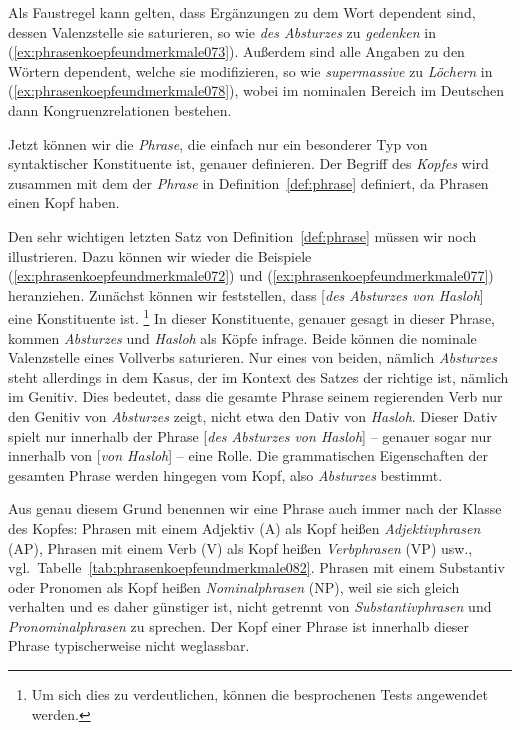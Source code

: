 Als Faustregel kann gelten, dass Ergänzungen zu dem Wort dependent sind, dessen Valenzstelle sie saturieren, so wie \textit{des Absturzes} zu \textit{gedenken} in (\ref{ex:phrasenkoepfeundmerkmale073}).
Außerdem sind alle Angaben zu den Wörtern dependent, welche sie modifizieren, so wie \textit{supermassive} zu \textit{Löchern} in (\ref{ex:phrasenkoepfeundmerkmale078}), wobei im nominalen Bereich im Deutschen dann Kongruenzrelationen bestehen.

Jetzt können wir die \textit{Phrase}, die einfach nur ein besonderer Typ von syntaktischer Konstituente ist, genauer definieren.
Der Begriff des \textit{Kopfes} wird zusammen mit dem der \textit{Phrase} in Definition~\ref{def:phrase} definiert, da Phrasen einen Kopf haben.


Den sehr wichtigen letzten Satz von Definition~\ref{def:phrase} müssen wir noch illustrieren.
Dazu können wir wieder die Beispiele (\ref{ex:phrasenkoepfeundmerkmale072}) und (\ref{ex:phrasenkoepfeundmerkmale077}) heranziehen.
Zunächst können wir feststellen, dass [\textit{des Absturzes von Hasloh}] eine Konstituente ist.%
\footnote{Um sich dies zu verdeutlichen, können die besprochenen Tests angewendet werden.}
In dieser Konstituente, genauer gesagt in dieser Phrase, kommen \textit{Absturzes} und \textit{Hasloh} als Köpfe infrage.
Beide können die nominale Valenzstelle eines Vollverbs saturieren.
Nur eines von beiden, nämlich \textit{Absturzes} steht allerdings in dem Kasus, der im Kontext des Satzes der richtige ist, nämlich im Genitiv.
Dies bedeutet, dass die gesamte Phrase seinem regierenden Verb nur den Genitiv von \textit{Absturzes} zeigt, nicht etwa den Dativ von \textit{Hasloh}.
Dieser Dativ spielt nur innerhalb der Phrase [\textit{des Absturzes von Hasloh}] -- genauer sogar nur innerhalb von [\textit{von Hasloh}] -- eine Rolle.
Die grammatischen Eigenschaften der gesamten Phrase werden hingegen vom Kopf, also \textit{Absturzes} bestimmt.

Aus genau diesem Grund benennen wir eine Phrase auch immer nach der Klasse des Kopfes:
Phrasen mit einem Adjektiv (A) als Kopf heißen \textit{Adjektivphrasen} (AP), Phrasen mit einem Verb (V) als Kopf heißen \textit{Verbphrasen} (VP) usw., vgl.\ Tabelle~\ref{tab:phrasenkoepfeundmerkmale082}.
Phrasen mit einem Substantiv oder Pronomen als Kopf heißen \textit{Nominalphrasen} (NP), weil sie sich gleich verhalten und es daher günstiger ist, nicht getrennt von \textit{Substantivphrasen} und \textit{Pronominalphrasen} zu sprechen.
Der Kopf einer Phrase ist innerhalb dieser Phrase typischerweise nicht weglassbar.\label{abs:phrasenkoepfeundmerkmale081}

